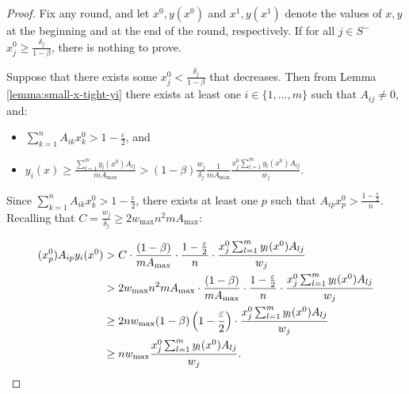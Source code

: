 \documentclass[11pt]{article}
\begin{document}
\begin{proof}
Fix any round, and let $x^0, y(x^0)$ and $x^1, y(x^1)$ denote the values of $x, y$ at the beginning and at the end of the round, respectively. If for all $j\in S^-$ $x_j^0 \geq \frac{\delta_j}{1-\beta}$, there is nothing to prove. 

Suppose that there exists some $x_j^0<\frac{\delta_j}{1-\beta}$ that decreases. Then from Lemma \ref{lemma:small-x-tight-yi} there exists at least one $i\in\{1,...,m\}$ such that $A_{ij}\neq 0$, and: 
\begin{itemize}
\item $\sum_{k=1}^nA_{ik}x_k^0 > 1- \frac{\varepsilon}{2}$, and
\item $y_i(x) \geq \frac{\sum_{l=1}^my_l(x^0)A_{lj}}{mA_{\max}} > (1-\beta)\frac{w_j}{\delta_j}\frac{1}{mA_{\max}}\frac{x_j^0\sum_{l=1}^my_l(x^0)A_{lj}}{w_j}$.
\end{itemize}
Since $\sum_{k=1}^nA_{ik}x_k^0 > 1- \frac{\varepsilon}{2}$, there exists at least one $p$ such that $A_{ip}x_p^0 > \frac{1-\frac{\varepsilon}{2}}{n}$. 
Recalling that $C = \frac{w_j}{\delta_j}\geq 2w_{\max}n^2mA_{\max}$:

\begin{align}
(x_p^0)A_{ip}y_i(x^0)&>C\cdot \frac{(1-\beta)}{m {A_{\max}}}\cdot\frac{1-\frac{\varepsilon}{2}}{n}\cdot\frac{x_j^0\sum_{l=1}^my_l(x^0)A_{lj}}{w_j} \notag\\
&>2w_{\max}n^2m{A_{\max}}\cdot \frac{(1-\beta)}{m {A_{\max}}}\cdot\frac{1-\frac{\varepsilon}{2}}{n}\cdot \frac{x_j^0\sum_{l=1}^my_l(x^0)A_{lj}}{w_j}\notag\\
&\geq  2nw_{\max}(1-\beta)\left(1-\frac{\varepsilon}{2}\right)\cdot \frac{x_j^0\sum_{l=1}^m y_l(x^0)A_{lj}}{w_j}\notag\\
&\geq nw_{\max}\frac{x_j^0\sum_{l=1}^m y_l(x^0)A_{lj}}{w_j}. \label{eq:alpha=1-n-times-inc} 
\end{align}


\end{proof}
\end{document}
